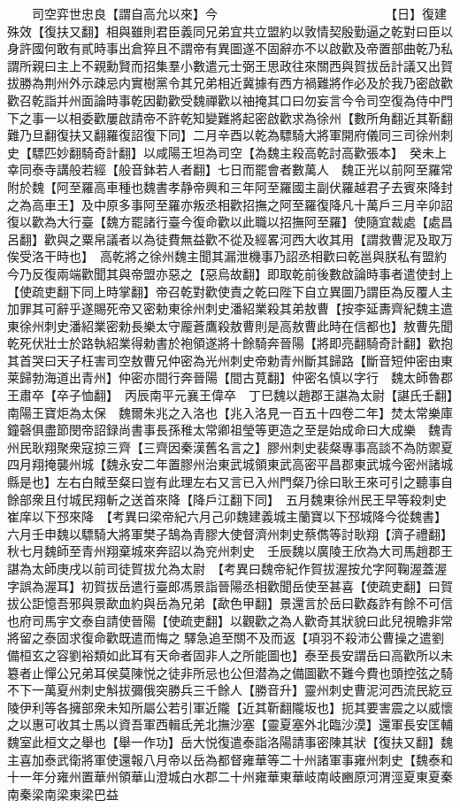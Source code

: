 　　司空弈世忠良【謂自高允以來】今　　　　　　　　　　　　　　【日】復建殊效【復扶又翻】相與雖則君臣義同兄弟宜共立盟約以敦情契殷勤逼之乾對曰臣以身許國何敢有貳時事出倉猝且不謂帝有異圖遂不固辭亦不以啟歡及帝置部曲乾乃私謂所親曰主上不親勳賢而招集羣小數遣元士弼王思政往來關西與賀拔岳計議又出賀拔勝為荆州外示疎忌内實樹黨令其兄弟相近冀據有西方禍難將作必及於我乃密啟歡歡召乾詣并州面論時事乾因勸歡受魏禪歡以䄂掩其口曰勿妄言今令司空復為侍中門下之事一以相委歡屢啟請帝不許乾知變難將起密啟歡求為徐州【數所角翻近其靳翻難乃旦翻復扶又翻羅復詔復下同】二月辛酉以乾為驃騎大將軍開府儀同三司徐州刺史【驃匹妙翻騎奇計翻】以咸陽王坦為司空【為魏主殺高乾討高歡張本】　癸未上幸同泰寺講般若經【般音鉢若人者翻】七日而罷會者數萬人　魏正光以前阿至羅常附於魏【阿至羅高車種也魏書孝静帝興和三年阿至羅國主副伏羅越君子去賓來降封之為高車王】及中原多事阿至羅亦叛丞相歡招撫之阿至羅復降凡十萬戶三月辛卯詔復以歡為大行臺【魏方罷諸行臺今復命歡以此職以招撫阿至羅】使隨宜裁處【處昌呂翻】歡與之粟帛議者以為徒費無益歡不從及經畧河西大收其用【謂救曹泥及取万俟受洛干時也】　高乾將之徐州魏主聞其漏泄機事乃詔丞相歡曰乾邕與朕私有盟約今乃反復兩端歡聞其與帝盟亦惡之【惡烏故翻】即取乾前後數啟論時事者遣使封上【使疏吏翻下同上時掌翻】帝召乾對歡使責之乾曰陛下自立異圖乃謂臣為反覆人主加罪其可辭乎遂賜死帝又密勅東徐州刺史潘紹業殺其弟敖曹【按李延夀齊紀魏主遣東徐州刺史潘紹業密勅長樂太守龎蒼鷹殺敖曹則是高敖曹此時在信都也】敖曹先聞乾死伏壯士於路執紹業得勅書於袍領遂將十餘騎奔晉陽【將即亮翻騎奇計翻】歡抱其首哭曰天子枉害司空敖曹兄仲密為光州刺史帝勅青州斷其歸路【斷音短仲密由東莱歸勃海道出青州】仲密亦間行奔晉陽【間古莧翻】仲密名慎以字行　魏太師魯郡王肅卒【卒子恤翻】　丙辰南平元襄王偉卒　丁巳魏以趙郡王諶為太尉【諶氏壬翻】南陽王寶炬為太保　魏爾朱兆之入洛也【兆入洛見一百五十四卷二年】焚太常樂庫鐘磬俱盡節閔帝詔録尚書事長孫稚太常卿祖瑩等更造之至是始成命曰大成樂　魏青州民耿翔聚衆寇掠三齊【三齊因秦漢舊名言之】膠州刺史裴粲專事高談不為防禦夏四月翔掩襲州城【魏永安二年置膠州治東武城領東武高密平昌郡東武城今密州諸城縣是也】左右白賊至粲曰豈有此理左右又言已入州門粲乃徐曰耿王來可引之聽事自餘部衆且付城民翔斬之送首來降【降戶江翻下同】　五月魏東徐州民王早等殺刺史崔庠以下邳來降　【考異曰梁帝紀六月己卯魏建義城主蘭寶以下邳城降今從魏書】　六月壬申魏以驃騎大將軍樊子鵠為青膠大使督濟州刺史蔡儁等討耿翔【濟子禮翻】秋七月魏師至青州翔棄城來奔詔以為兖州刺史　壬辰魏以廣陵王欣為大司馬趙郡王諶為太師庚戌以前司徒賀拔允為太尉　【考異曰魏帝紀作賀拔渥按允字阿鞠渥蓋渥字誤為渥耳】初賀拔岳遣行臺郎馮景詣晉陽丞相歡聞岳使至甚喜【使疏吏翻】曰賀拔公詎憶吾邪與景歃血約與岳為兄弟【歃色甲翻】景還言於岳曰歡姦詐有餘不可信也府司馬宇文泰自請使晉陽【使疏吏翻】以觀歡之為人歡奇其狀貌曰此兒視瞻非常將留之泰固求復命歡既遣而悔之驛急追至關不及而返【項羽不殺沛公曹操之遣劉備桓玄之容劉裕類如此耳有天命者固非人之所能圖也】泰至長安謂岳曰高歡所以未簒者止憚公兄弟耳侯莫陳悦之徒非所忌也公但潜為之備圖歡不難今費也頭控弦之騎不下一萬夏州刺史斛拔彌俄突勝兵三千餘人【勝音升】靈州刺史曹泥河西流民紇豆陵伊利等各擁部衆未知所屬公若引軍近隴【近其靳翻隴坂也】扼其要害震之以威懷之以惠可收其士馬以資吾軍西輯氐羌北撫沙塞【靈夏塞外北臨沙漠】還軍長安匡輔魏室此桓文之舉也【舉一作功】岳大悦復遣泰詣洛陽請事密陳其狀【復扶又翻】魏主喜加泰武衛將軍使還報八月帝以岳為都督雍華等二十州諸軍事雍州刺史【魏泰和十一年分雍州置華州領華山澄城白水郡二十州雍華東華岐南岐豳原河渭涇夏東夏秦南秦梁南梁東梁巴益